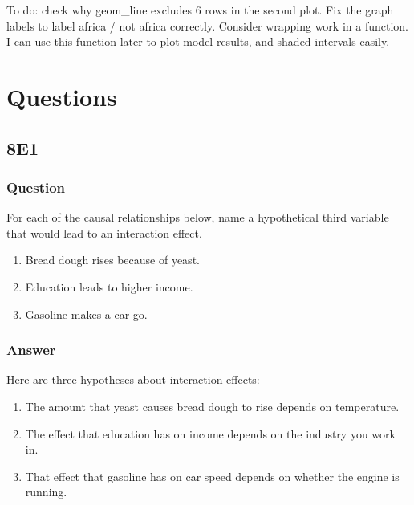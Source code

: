 \documentclass[
]{book}
\begin{document}
To do: check why geom\_line excludes 6 rows in the second plot.
Fix the graph labels to label africa / not africa correctly.
Consider wrapping work in a function. I can use this function later to plot model results, and shaded intervals easily.

\hypertarget{questions-7}{%
\section{Questions}\label{questions-7}}

\hypertarget{e1-6}{%
\subsection*{8E1}\label{e1-6}}

\hypertarget{question-75}{%
\subsubsection*{Question}\label{question-75}}

For each of the causal relationships below, name a hypothetical third variable that would lead to an interaction effect.

\begin{enumerate}
\def\labelenumi{\arabic{enumi}.}
\item
  Bread dough rises because of yeast.
\item
  Education leads to higher income.
\item
  Gasoline makes a car go.
\end{enumerate}

\hypertarget{answer-75}{%
\subsubsection*{Answer}\label{answer-75}}

Here are three hypotheses about interaction effects:

\begin{enumerate}
\def\labelenumi{\arabic{enumi}.}
\item
  The amount that yeast causes bread dough to rise depends on temperature.
\item
  The effect that education has on income depends on the industry you work in.
\item
  That effect that gasoline has on car speed depends on whether the engine is running.
\end{enumerate}
\end{document}
